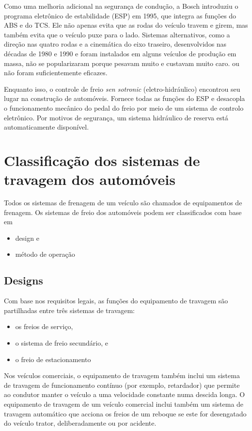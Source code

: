Como uma melhoria adicional na segurança de condução, a Bosch introduziu o programa eletrônico de estabilidade (ESP) em 1995, que integra as funções do ABS e do TCS. Ele não apenas evita que as rodas do veículo travem e girem, mas também evita que o veículo puxe para o lado. Sistemas alternativos, como a direção nas quatro rodas e a cinemática do eixo traseiro, desenvolvidos nas décadas de 1980 e 1990 e foram instalados em alguns veículos de produção em massa, não se popularizaram porque pesavam muito e custavam muito caro. ou não foram suficientemente eficazes.

Enquanto isso, o controle de freio \textit{sen sotronic} (eletro-hidráulico) encontrou seu lugar na construção de automóveis. Fornece todas as funções do ESP e desacopla o funcionamento mecânico do pedal do freio por meio de um sistema de controlo eletrônico. Por motivos de segurança, um sistema hidráulico de reserva está automaticamente disponível.

\section{Classificação dos sistemas de travagem dos automóveis}

Todos os sistemas de frenagem de um veículo são chamados de equipamentos de frenagem. Os sistemas de freio dos automóveis podem ser classificados com base em

\begin{itemize}
    \item design e
    \item método de operação
\end{itemize}

\subsection{Designs}

Com base nos requisitos legais, as funções do equipamento de travagem são partilhadas entre três sistemas de travagem:

\begin{itemize}
    \item os freios de serviço,
    \item o sistema de freio secundário, e
    \item o freio de estacionamento
\end{itemize}

Nos veículos comerciais, o equipamento de travagem também inclui um sistema de travagem de funcionamento contínuo (por exemplo, retardador) que permite ao condutor manter o veículo a uma velocidade constante numa descida longa. O equipamento de travagem de um veículo comercial inclui também um sistema de travagem automático que acciona os freios de um reboque se este for desengatado do veículo trator, deliberadamente ou por acidente.

